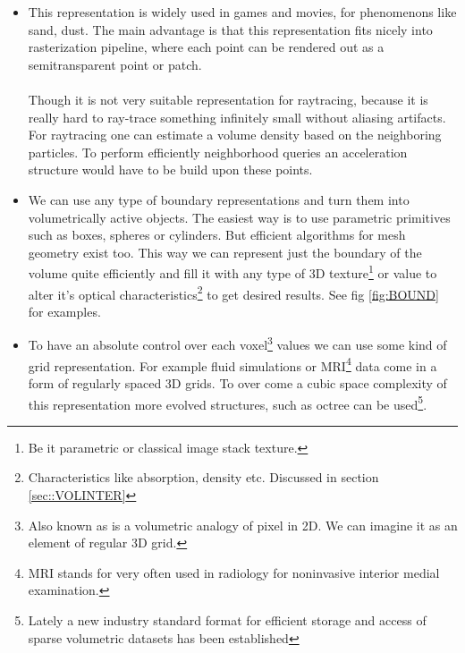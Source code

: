 \begin{itemize}
\item {}
This representation is widely used in games and movies, for phenomenons like sand, dust. The main advantage is that this representation fits nicely into rasterization pipeline, where each point can be rendered out as a semitransparent point or patch. 
\\
\\
Though it is not very suitable representation for raytracing, because it is really hard to ray-trace something infinitely small without aliasing artifacts. For raytracing one can estimate a volume density based on the neighboring particles. To perform efficiently neighborhood queries an acceleration structure would have to be build upon these points.

\item {}
We can use any type of boundary representations and turn them into volumetrically active objects. The easiest way is to use parametric primitives such as boxes, spheres or cylinders. But efficient algorithms for mesh geometry exist too. This way we can represent just the boundary of the volume quite efficiently and fill it with any type of 3D texture\footnote{Be it parametric or classical image stack texture.} or value to alter it's optical characteristics\footnote{Characteristics like absorption, density etc. Discussed in section \ref{sec::VOLINTER}} to get desired results. See fig \ref{fig:BOUND} for examples.


\item {}
To have an absolute control over each voxel\footnote{Also known as  is a volumetric analogy of pixel in 2D. We can imagine it as an element of regular 3D grid.} values we can use some kind of grid representation. For example fluid simulations or MRI\footnote{MRI stands for  very often used in radiology for noninvasive interior medial examination. } data come in a form of regularly spaced 3D grids. To over come a cubic space complexity of this representation more evolved structures, such as octree can be used\footnote{Lately a new industry standard format \cite{OPENVDB} for efficient storage and access of sparse volumetric datasets has been established}.


\end{itemize}
